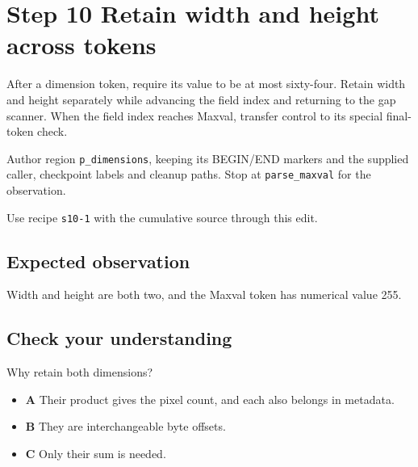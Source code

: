\section{Step 10 Retain width and height across tokens}\label{ppm-s10}

After a dimension token, require its value to be at most sixty-four. Retain width and height separately while advancing the field index and returning to the gap scanner. When the field index reaches Maxval, transfer control to its special final-token check.

Author region \texttt{p\_dimensions}, keeping its BEGIN/END markers and the supplied caller, checkpoint labels and cleanup paths. Stop at \texttt{parse\_maxval} for the observation.

Use recipe \texttt{s10-1} with the cumulative source through this edit.

\subsection{Expected observation}
Width and height are both two, and the Maxval token has numerical value 255.

\subsection{Check your understanding}
Why retain both dimensions?

\begin{itemize}
  \item \textbf{A} Their product gives the pixel count, and each also belongs in metadata.
  \item \textbf{B} They are interchangeable byte offsets.
  \item \textbf{C} Only their sum is needed.
\end{itemize}
